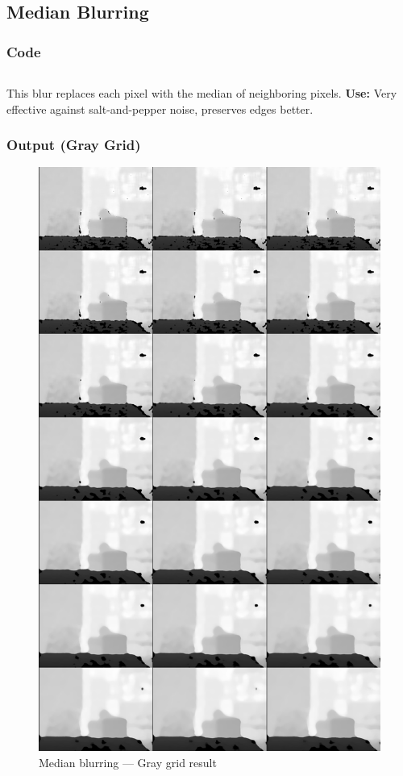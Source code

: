 \documentclass[a4paper,11pt]{article}
\begin{document}
	
	
	\subsection{Median Blurring}
	\subsubsection*{Code}
	\inputminted{python}{Python_Files/06_median_blur.py}
	
	This blur replaces each pixel with the median of neighboring pixels.  
	\textbf{Use:} Very effective against salt-and-pepper noise, preserves edges better.
	

	
	\subsubsection*{Output (Gray Grid)}
	\begin{figure}[H]
		\centering
		\includegraphics[width=\textwidth,height=0.9\textheight,keepaspectratio]{Images/06_median_gray_grid.png}
		\caption{Median blurring — Gray grid result}
	\end{figure}
	\clearpage
	
\end{document}
